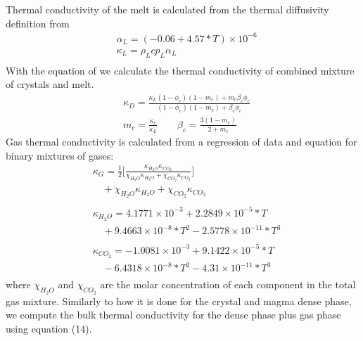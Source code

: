 Thermal conductivity of the melt is calculated from the thermal diffusivity definition from \cite{moitra2018}
\begin{equation}
\begin{split}
&\alpha_L = (-0.06 + 4.57*T)\times 10^{-6}\\
&\kappa_L = \rho_L cp_L \alpha_L\\
\end{split}
\end{equation}
With the equation of \cite{heap2020} we calculate the thermal conductivity of combined mixture of crystals and melt.
\begin{equation}
\begin{split}
&\kappa_D = \frac{\kappa_L(1-\phi_c)(1-m_c) + m_c \beta_c \phi_c}{(1-\phi_c)(1-m_c) + \beta_c \phi_c}\\
&m_c = \frac{\kappa_c}{\kappa_L} \qquad \beta_c = \frac{3(1-m_c)}{2+m_c}
\end{split}
\end{equation}
Gas thermal conductivity is calculated from a regression of data and \cite{udoetok2013} equation for binary mixtures of gases:   
\begin{equation}
\begin{split}
&\kappa_G = \frac{1}{2}\bigg[\frac{\kappa_{H_2O}\kappa_{CO_2}}{\chi_{H_2O}\kappa_{H_2O} + \chi_{CO_2}\kappa_{CO_2}}\bigg] \\
&\quad +\chi_{H_2O}\kappa_{H_2O} + \chi_{CO_2}\kappa_{CO_2}\\
\\&\kappa_{H_2O} = 4.1771\times 10^{-3} + 2.2849\times 10^{-5}*T \\
&\quad + 9.4663\times 10^{-8} * T^2 - 2.5778\times 10^{-11} * T^3\\
\\&\kappa_{CO_2} = -1.0081\times 10^{-3} + 9.1422\times 10^{-5}*T \\
&\quad - 6.4318\times 10^{-8} * T^2 - 4.31\times 10^{-11} * T^3\\
\end{split}
\end{equation}
where $\chi_{H_2O}$ and $\chi_{CO_2}$ are the molar concentration of each component in the total gas mixture. Similarly to how it is done for the crystal and magma dense phase, we compute the bulk thermal conductivity for the dense phase plus gas phase using equation (14).

